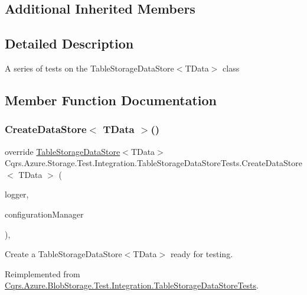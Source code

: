 \subsection*{Additional Inherited Members}


\subsection{Detailed Description}
A series of tests on the Table\+Storage\+Data\+Store$<$\+T\+Data$>$ class 



\subsection{Member Function Documentation}
\mbox{\label{classCqrs_1_1Azure_1_1Storage_1_1Test_1_1Integration_1_1TableStorageDataStoreTests_a4c23960b33f58ea56707d736616a9f53_a4c23960b33f58ea56707d736616a9f53}} 
\subsubsection{\texorpdfstring{Create\+Data\+Store$<$ T\+Data $>$()}{CreateDataStore< TData >()}}
{\footnotesize\ttfamily override \hyperlink{classCqrs_1_1Azure_1_1BlobStorage_1_1DataStores_1_1TableStorageDataStore}{Table\+Storage\+Data\+Store}$<$T\+Data$>$ Cqrs.\+Azure.\+Storage.\+Test.\+Integration.\+Table\+Storage\+Data\+Store\+Tests.\+Create\+Data\+Store$<$ T\+Data $>$ (\begin{DoxyParamCaption}\item[{I\+Logger}]{logger,  }\item[{\hyperlink{interfaceCqrs_1_1Configuration_1_1IConfigurationManager}{I\+Configuration\+Manager}}]{configuration\+Manager }\end{DoxyParamCaption})\hspace{0.3cm}{\ttfamily [protected]}, {\ttfamily [virtual]}}



Create a Table\+Storage\+Data\+Store$<$\+T\+Data$>$ ready for testing. 



Reimplemented from \hyperlink{classCqrs_1_1Azure_1_1BlobStorage_1_1Test_1_1Integration_1_1TableStorageDataStoreTests_a76d6ef854f24e39f80de66e86cfa967c_a76d6ef854f24e39f80de66e86cfa967c}{Cqrs.\+Azure.\+Blob\+Storage.\+Test.\+Integration.\+Table\+Storage\+Data\+Store\+Tests}.


